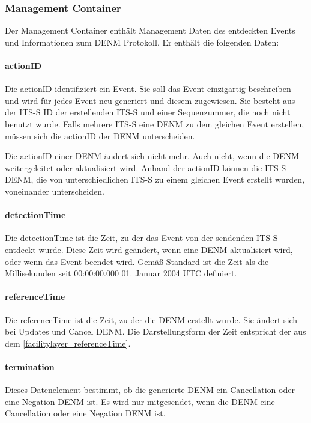 \subsubsection{Management Container \label{facilityLayer_denmManagementContainer}}
Der Management Container enthält Management Daten des entdeckten Events und Informationen zum \ac{DENM} Protokoll. Er enthält die folgenden Daten:
\paragraph{actionID}
Die actionID identifiziert ein Event. Sie soll das Event einzigartig beschreiben und wird für jedes Event neu generiert und diesem zugewiesen. Sie besteht aus der \ac{ITS-S} \ac{ID} der erstellenden \ac{ITS-S} und einer Sequenzummer, die noch nicht benutzt wurde. Falls mehrere \ac{ITS-S} eine \ac{DENM} zu dem gleichen Event erstellen, müssen sich die actionID der \ac{DENM} unterscheiden. 

Die actionID einer \ac{DENM} ändert sich nicht mehr. Auch nicht, wenn die \ac{DENM} weitergeleitet oder aktualisiert wird. Anhand der actionID können die \ac{ITS-S} \ac{DENM}, die von unterschiedlichen \ac{ITS-S} zu einem gleichen Event erstellt wurden, voneinander unterscheiden.

\paragraph{detectionTime \label{facilitylayer_referenceTime}}
Die detectionTime ist die Zeit, zu der das Event von der sendenden \ac{ITS-S} entdeckt wurde. Diese Zeit wird geändert, wenn eine \ac{DENM} aktualisiert wird, oder wenn das Event beendet wird. Gemäß Standard \cite{ts102894-2} ist die Zeit als die Millisekunden seit 00:00:00.000 01. Januar 2004 \ac{UTC} definiert.

\paragraph{referenceTime}
Die referenceTime ist die Zeit, zu der die \ac{DENM} erstellt wurde. Sie ändert sich bei Updates und Cancel \ac{DENM}. Die Darstellungsform der Zeit entspricht der aus dem \autoref{facilitylayer_referenceTime}.

\paragraph{termination}
Dieses Datenelement bestimmt, ob die generierte \ac{DENM} ein Cancellation oder eine Negation \ac{DENM} ist. Es wird nur mitgesendet, wenn die \ac{DENM} eine Cancellation oder eine Negation \ac{DENM} ist. 

